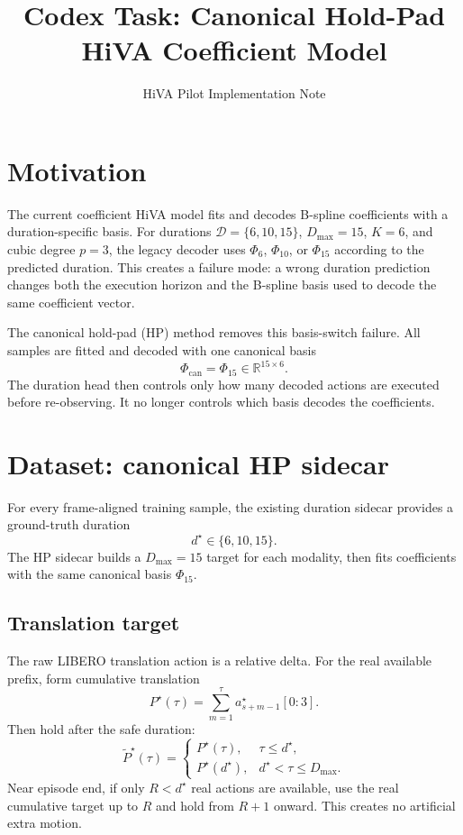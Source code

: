 \documentclass[11pt]{article}
\title{Codex Task: Canonical Hold-Pad HiVA Coefficient Model}
\author{HiVA Pilot Implementation Note}
\date{}
\begin{document}
\maketitle

\section{Motivation}
The current coefficient HiVA model fits and decodes B-spline coefficients with a duration-specific basis.  For durations
\(\mathcal D=\{6,10,15\}\), \(D_{\max}=15\), \(K=6\), and cubic degree \(p=3\), the legacy decoder uses
\(\Phi_6\), \(\Phi_{10}\), or \(\Phi_{15}\) according to the predicted duration.  This creates a failure mode: a wrong duration prediction changes both the execution horizon and the B-spline basis used to decode the same coefficient vector.

The canonical hold-pad (HP) method removes this basis-switch failure.  All samples are fitted and decoded with one canonical basis
\begin{equation}
\Phi_{\mathrm{can}}=\Phi_{15}\in\mathbb{R}^{15\times 6}.
\end{equation}
The duration head then controls only how many decoded actions are executed before re-observing.  It no longer controls which basis decodes the coefficients.

\section{Dataset: canonical HP sidecar}
For every frame-aligned training sample, the existing duration sidecar provides a ground-truth duration
\begin{equation}
d^\star\in\{6,10,15\}.
\end{equation}
The HP sidecar builds a \(D_{\max}=15\) target for each modality, then fits coefficients with the same canonical basis \(\Phi_{15}\).

\subsection{Translation target}
The raw LIBERO translation action is a relative delta.  For the real available prefix, form cumulative translation
\begin{equation}
P^\star(\tau)=\sum_{m=1}^{\tau} a^\star_{s+m-1}[0:3].
\end{equation}
Then hold after the safe duration:
\begin{equation}
\widetilde P^\star(\tau)=
\begin{cases}
P^\star(\tau), & \tau\le d^\star,\\
P^\star(d^\star), & d^\star<\tau\le D_{\max}.
\end{cases}
\end{equation}
Near episode end, if only \(R<d^\star\) real actions are available, use the real cumulative target up to \(R\) and hold from \(R+1\) onward.  This creates no artificial extra motion.
\end{document}
